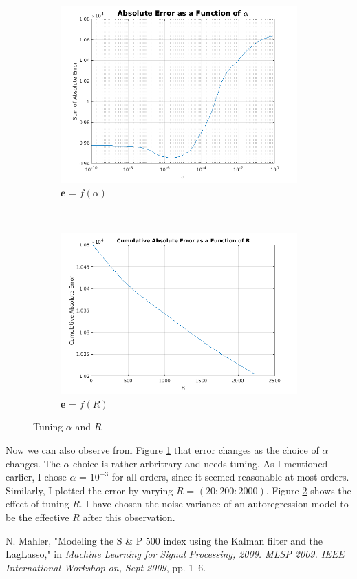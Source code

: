 \documentclass[11pt, fleqn]{article}
\begin{document}
\begin{figure}[!h]
    \centering
    \begin{subfigure}[b]{0.3\textwidth}
        \includegraphics[width=\textwidth]{error-vs-alpha-order-3.png}
	\caption{$\bm{e}$ = $f(\alpha)$}
	\label{fig:error-vs-alpha-order-3}
    \end{subfigure}
    ~ 
	\begin{subfigure}[b]{0.3\textwidth}
        \includegraphics[width=\textwidth]{error-vs-r.png}
	\caption{$\bm{e}$ = $f(R)$}
	\label{fig:error-vs-r}
    \end{subfigure}
	\caption{Tuning $\alpha$ and $R$}
	\label{fig:tuning-alpha-r}
\end{figure}

Now we can also observe from Figure \ref{fig:error-vs-alpha-order-3} that error changes as the choice of $\alpha$ changes. The $\alpha$ choice is rather arbritrary and needs tuning. As I mentioned earlier, I chose $\alpha$ = $10^{-3}$ for all orders, since it seemed reasonable at most orders. Similarly, I plotted the error by varying $R$ = $(20:200:2000)$. Figure \ref{fig:error-vs-r} shows the effect of tuning $R$. I have chosen the noise variance of an autoregression model to be the effective $R$ after this observation.\\


\begin{thebibliography}{9}
N. Mahler, "Modeling the S \& P 500 index using the Kalman filter and the LagLasso," in \textit{Machine Learning for Signal Processing, 2009. MLSP 2009. IEEE International Workshop on, Sept 2009}, pp. 1–6.

\end{thebibliography}
\end{document}
